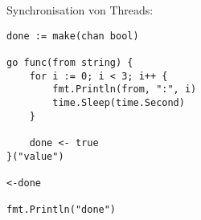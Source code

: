 \documentclass{beamer}
\begin{document}
	
	\begin{frame}[fragile]{}
		\begin{center}
			Synchronisation von Threads:
		\end{center}
		\begin{verbatim}
done := make(chan bool)

go func(from string) {
	for i := 0; i < 3; i++ {
		fmt.Println(from, ":", i)
		time.Sleep(time.Second)
	}
	
	done <- true
}("value")

<-done

fmt.Println("done")
		\end{verbatim}
\end{frame}
\end{document}
